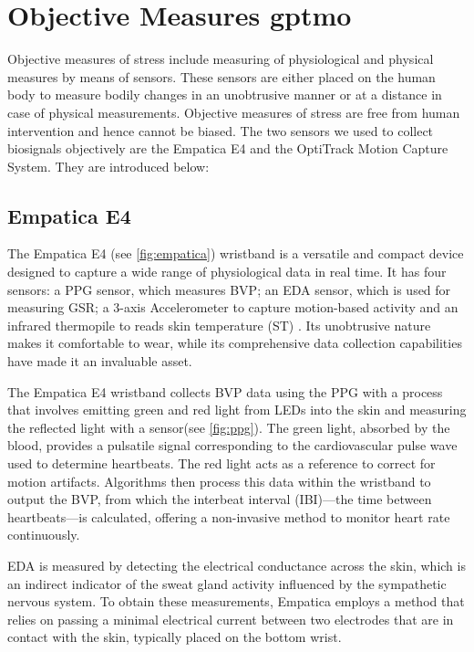 \section{Objective Measures \gls{gptmo}}
Objective measures of stress include measuring of physiological and physical measures by means of sensors. These sensors are either placed on the human body to measure bodily changes in an unobtrusive manner or at a distance in case of physical measurements. Objective measures of stress are free from human intervention and hence cannot be biased. 
The two sensors we used to collect biosignals objectively are the Empatica E4 and the OptiTrack Motion Capture System. They are introduced below:

\subsection{Empatica E4}
The Empatica E4 \parencite{empatica} (see \autoref*{fig:empatica}) wristband is a versatile and compact device designed to capture a wide range of physiological data in real time. 
It has four sensors: a \gls{PPG} sensor, which measures \gls{BVP}; an \gls{EDA} sensor, which is used for measuring \gls{GSR}; a 3-axis Accelerometer to capture motion-based activity and an infrared thermopile to reads skin temperature (ST) \parencite{empa}. Its unobtrusive nature makes it comfortable to wear, while its comprehensive data collection capabilities have made it an invaluable asset.

The Empatica E4 wristband collects \gls{BVP} data using the \gls{PPG} with a process that involves emitting green and red light from LEDs into the skin and measuring the reflected light with a sensor(see \autoref{fig:ppg}). The green light, absorbed by the blood, provides a pulsatile signal corresponding to the cardiovascular pulse wave used to determine heartbeats. The red light acts as a reference to correct for motion artifacts. Algorithms then process this data within the wristband to output the \gls{BVP}, from which the interbeat interval (IBI)—the time between heartbeats—is calculated, offering a non-invasive method to monitor heart rate continuously.\parencite{emp2}

\gls{EDA} is measured by detecting the electrical conductance across the skin, which is an indirect indicator of the sweat gland activity influenced by the sympathetic nervous system. To obtain these measurements, Empatica employs a method that relies on passing a minimal electrical current between two electrodes that are in contact with the skin, typically placed on the bottom wrist.

